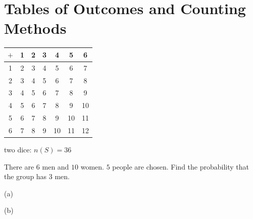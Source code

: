 \section{Tables of Outcomes and Counting Methods}
\noindent\begin{minipage}[c]{0.43\textwidth}
\centering\renewcommand{\arraystretch}{1.05}\small
\begin{tabular}{c|cccccc}
$+$&1&2&3&4&5&6\\\hline
1&2&3&4&5&6&\cellcolor{blue!25}7\\
2&3&4&5&6&\cellcolor{blue!25}7&8\\
3&4&5&6&\cellcolor{blue!25}7&8&9\\
4&5&6&\cellcolor{blue!25}7&8&9&10\\
5&6&\cellcolor{blue!25}7&8&9&10&11\\
6&\cellcolor{blue!25}7&8&9&10&11&12
\end{tabular}\par\smallskip
{\footnotesize two dice: $n(S)=36$}
\end{minipage}\hfill
\begin{minipage}[c]{0.54\textwidth}
\end{minipage}\par\smallskip
\noindent\exlab There are $6$ men and $10$ women. $5$ people are chosen. Find the probability that the group has $3$ men.

\noindent\begin{minipage}[t]{0.6\textwidth}
(a)
\end{minipage}\hfill\vrule\hfill
\begin{minipage}[t]{0.36\textwidth}
(b)
\end{minipage}
